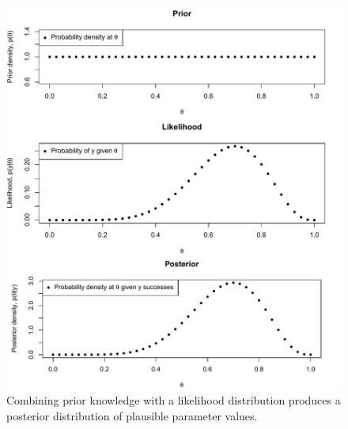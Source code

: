 \documentclass[11pt,a4paper,article]{memoir} %
\begin{document}
\begin{figure}
\includegraphics[width=\textwidth]{Bayesian_inference.pdf}
\caption{Combining prior knowledge with a likelihood distribution produces a posterior distribution of plausible parameter values.}
\label{fig:binom_bayes_inference}
\end{figure}
\end{document}
